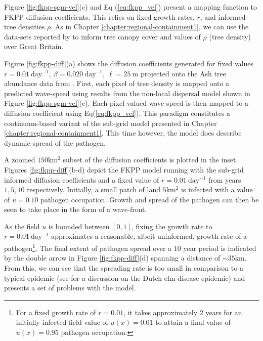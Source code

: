 Figure \ref{fig:fkpp-sgm-vel}(c) and Eq (\ref{eq:fkpp_vel}) present a mapping function to FKPP diffusion coefficients. %
This relies on fixed growth rates, $r$, and informed tree densities $\rho$. %
As in Chapter \ref{chapter:regional-containment1}, we can use the data-sets reported by \cite{hill.data} to inform tree canopy cover and values of $\rho$ (tree density) over Great Britain. %

Figure \ref{fig:fkpp-diff}(a) shows the diffusion coefficients generated for fixed values $r=0.01\ \mathrm{day^{-1}},\ \beta=0.020\ \mathrm{day^{-1}},\ \ell=25\ \mathrm{m}$ projected onto the Ash tree abundance data from \cite{hill.data}. %
First, each pixel of tree density is mapped onto a predicted wave-speed using results from the non-local dispersal model shown in Figure \ref{fig:fkpp-sgm-vel}(c). %
Each pixel-valued wave-speed is then mapped to a diffusion coefficient using Eq(\ref{eq:fkpp_vel}). %
This paradigm constitutes a continuum-based variant of the sub-grid model presented in Chapter \ref{chapter:regional-containment1}. %
This time however, the model does describe dynamic spread of the pathogen. 

A zoomed $150\mathrm{km^2}$ subset of the diffusion coefficients is plotted in the inset. %
Figures \ref{fig:fkpp-diff}(b-d) depict the FKPP model running with the sub-grid informed diffusion coefficients and a fixed value of $r=0.01\ \mathrm{day^{-1}}$ from years $1, 5, 10$ respectively. %
Initially, a small patch of land $5\mathrm{km^2}$ is infected with a value of $u=0.10$ pathogen occupation. Growth and spread of the pathogen can then be seen to take place in the form of a wave-front.  %

As the field $u$ is bounded between $[0, 1]$, fixing the growth rate to $r=0.01\ \mathrm{day^{-1}}$ approximates a reasonable, %
albeit uninformed, growth rate of a pathogen\footnote{For a fixed growth rate of $r=0.01$, it takes approximately $2$ years for an initially infected field value of $u(x)=0.01$ to attain a final value of $u(x)=0.95$ pathogen occupation.}. %
The final extent of pathogen spread over a $10$ year period is indicated by the double arrow in Figure \ref{fig:fkpp-diff}(d) spanning a distance of $\sim 35\mathrm{km}$. %
From this, we can see that the spreading rate is too small in comparison to a typical epidemic (see \cite{dutch-elm-mismanage} for a discussion on the Dutch elm disease epidemic) and presents a set of problems with the model. %


